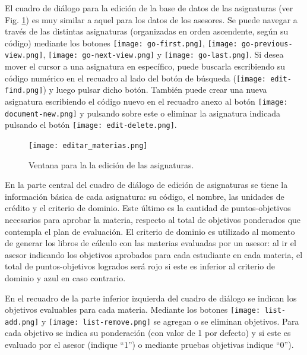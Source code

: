 \documentclass[letterpaper,12pt]{book}
\begin{document}
El cuadro de diálogo para la edición de la base de datos de las asignaturas (ver Fig. \ref{fig:editar_materias}) es muy similar a aquel para los datos de los asesores. Se puede navegar a través de las distintas asignaturas (organizadas en orden ascendente, según su código) mediante los botones \texttt{[image: go-first.png]}, \texttt{[image: go-previous-view.png]}, \texttt{[image: go-next-view.png]} y \texttt{[image: go-last.png]}. Si desea mover el cursor a una asignatura en específico, puede buscarla escribiendo su código numérico en el recuadro al lado del botón de búsqueda (\texttt{[image: edit-find.png]}) y luego pulsar dicho botón. También puede crear una nueva asignatura escribiendo el código nuevo en el recuadro anexo al botón \texttt{[image: document-new.png]} y pulsando sobre este o eliminar la asignatura indicada pulsando el botón \texttt{[image: edit-delete.png]}.

\begin{figure}[!ht]
  \centering
  \texttt{[image: editar\_materias.png]}
  \caption{Ventana para la la edición de las asignaturas.}
  \label{fig:editar_materias}
\end{figure}

En la parte central del cuadro de diálogo de edición de asignaturas se tiene la información básica de cada asignatura: su código, el nombre, las unidades de crédito y el criterio de dominio. Este último es la cantidad de puntos-objetivos necesarios para aprobar la materia, respecto al total de objetivos ponderados que contempla el plan de evaluación. El criterio de dominio es utilizado al momento de generar los libros de cálculo con las materias evaluadas por un asesor: al ir el asesor indicando los objetivos aprobados para cada estudiante en cada materia, el total de puntos-objetivos logrados será rojo si este es inferior al criterio de dominio y azul en caso contrario.

En el recuadro de la parte inferior izquierda del cuadro de diálogo se indican los objetivos evaluables para cada materia. Mediante los botones \texttt{[image: list-add.png]} y \texttt{[image: list-remove.png]} se agregan o se eliminan objetivos. Para cada objetivo se indica su ponderación (con valor de 1 por defecto) y si este es evaluado por el asesor (indique ``1'') o mediante pruebas objetivas indique ``0'').
\end{document}
